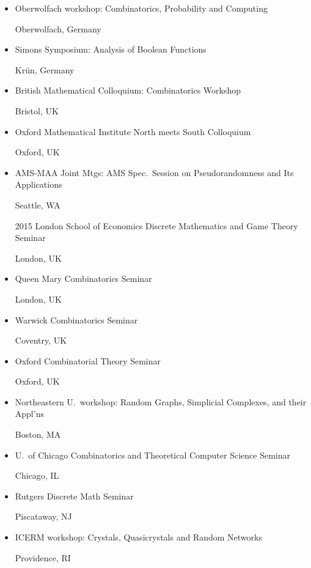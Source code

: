 \documentclass[11pt]{amsart}
\newcommand{\rightloc}[1]{\hfill {\raggedright #1}}
\begin{document}
\begin{itemize}[leftmargin=.4in,itemsep=5pt,topsep=0pt,label={}]
\item Oberwolfach workshop: Combinatorics, Probability and Computing \rightloc{Oberwolfach, Germany}

\item Simons Symposium: Analysis of Boolean Functions \rightloc{Kr\"un, Germany}

\item British Mathematical Colloquium: Combinatorics Workshop \rightloc{Bristol, UK}

\item Oxford Mathematical Institute North meets South Colloquium \rightloc{Oxford, UK}

\item AMS-MAA Joint Mtgs: AMS Spec.~Session on Pseudorandomness and Its Applications \rightloc{Seattle, WA}

\item[2015]
  London School of Economics Discrete Mathematics and
  Game Theory Seminar \rightloc{London, UK}

\item
  Queen Mary Combinatorics Seminar \rightloc{London, UK}

\item Warwick Combinatorics Seminar \rightloc{Coventry, UK}

\item Oxford Combinatorial Theory Seminar \rightloc{Oxford, UK}
  
\item Northeastern U.\ workshop: Random Graphs, Simplicial Complexes, and their Appl'ns \rightloc{Boston, MA}

\item U.\ of Chicago Combinatorics and Theoretical Computer
  Science Seminar \rightloc{Chicago, IL}

\item Rutgers Discrete Math Seminar \rightloc{Piscataway, NJ}


\item ICERM workshop: Crystals, Quasicrystals and Random Networks
  \rightloc{Providence, RI}


\end{itemize}
\end{document}
